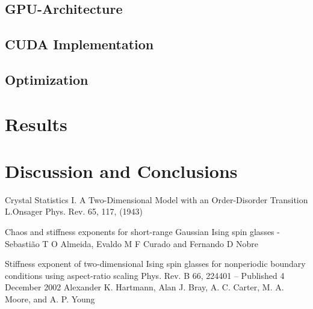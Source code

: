 \documentclass[paper=a4, fontsize=11pt]{scrartcl} %
\numberwithin{equation}{section} %
\numberwithin{figure}{section} %
\numberwithin{table}{section} %
\begin{document}
\subsection{GPU-Architecture}

\subsection{CUDA Implementation}

\subsection{Optimization}

\section{Results}
\label{sec:results}

\section{Discussion and Conclusions}
\label{sec:discussion}

\begin{thebibliography}{100}

Crystal Statistics I. A Two-Dimensional Model with an Order-Disorder Transition
L.Onsager
Phys. Rev. 65, 117, (1943)

Chaos and stiffness exponents for short-range Gaussian Ising spin glasses - Sebasti\~{a}o T O Almeida, Evaldo M F Curado and
Fernando D Nobre

Stiffness exponent of two-dimensional Ising spin glasses for nonperiodic boundary conditions using aspect-ratio scaling
Phys. Rev. B 66, 224401 – Published 4 December 2002
Alexander K. Hartmann, Alan J. Bray, A. C. Carter, M. A. Moore, and A. P. Young

\end{thebibliography}
\end{document}

